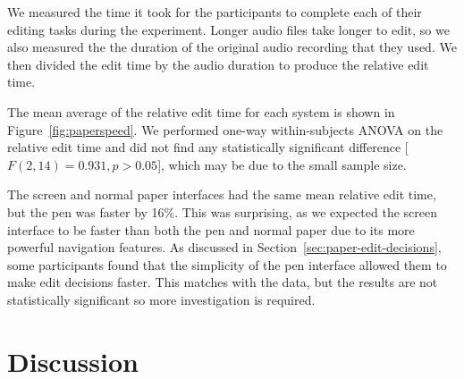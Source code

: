 We measured the time it took for the participants to complete each of their editing tasks during the experiment.
Longer audio files take longer to edit, so we also measured the the duration of the original audio recording that they
used. We then divided the edit time by the audio duration to produce the relative edit time.


The mean average of the relative edit time for each system is shown in Figure~\ref{fig:paperspeed}. We performed
one-way within-subjects ANOVA on the relative edit time and did not find any statistically significant difference
[$F(2,14) = 0.931, p > 0.05$], which may be due to the small sample size.

The screen and normal paper interfaces had the same mean relative edit time, but the pen was faster by 16\%.  This was
surprising, as we expected the screen interface to be faster than both the pen and normal paper due to its more
powerful navigation features. As discussed in Section~\ref{sec:paper-edit-decisions}, some participants found that the
simplicity of the pen interface allowed them to make edit decisions faster. This matches with the data, but the results
are not statistically significant so more investigation is required.

\section{Discussion}\label{sec:paper-discussion}




